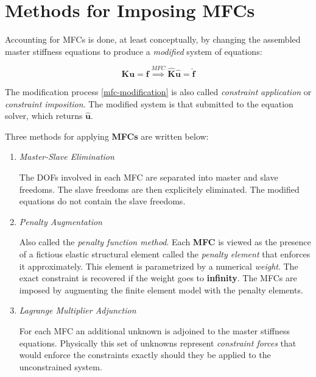 \documentclass[10pt,b5paper,titlepage]{book}
\newcommand{\m}{\mathbf}
\begin{document}
\section{Methods for Imposing MFCs}

Accounting for MFCs is done, at least conceptually, by changing the assembled master
stiffness equations to produce a \textit{modified} system of equations:

\begin{equation}\label{mfc-modification}
    \m{K} \m{u} = \m{f} \overset{MFC}{\implies}
    \hat{\m{K}} \hat{\m{u}} = \hat{\m{f}}
\end{equation}

The modification process \eqref{mfc-modification} is also called  \textit{constraint}
\textit{application} or \textit{constraint imposition}. The modified system
is that submitted to the equation solver, which returns $ \hat{\m{u}} $.

Three methods for applying \textbf{MFCs} are written below:

\begin{enumerate}
    \item \textit{Master-Slave Elimination}

        The DOFs involved in each MFC are separated into master and slave freedoms.
        The slave freedoms are then explicitely eliminated. The modified equations
        do not contain the slave freedoms.

    \item \textit{Penalty Augmentation}

        Also called the \textit{penalty function method}. Each \textbf{MFC}
        is viewed as the presence of a fictious elastic structural element called
        the \textit{penalty element} that enforces it approximately. This element
        is parametrized by a numerical \textit{weight}. The exact constraint is
        recovered if the weight goes to \textbf{infinity}. The MFCs are imposed
        by augmenting the finite element model with the penalty elements.

    \item \textit{Lagrange Multiplier Adjunction}

        For each MFC an additional unknown is adjoined to the master stiffness
        equations. Physically this set of unknowns represent
        \textit{constraint forces} that would enforce the constraints exactly
        should they be applied to the unconstrained system.
\end{enumerate}
\end{document}

